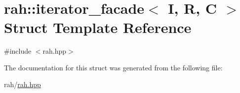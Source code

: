 \hypertarget{structrah_1_1iterator__facade}{}\section{rah\+::iterator\+\_\+facade$<$ I, R, C $>$ Struct Template Reference}
\label{structrah_1_1iterator__facade}


{\ttfamily \#include $<$rah.\+hpp$>$}



The documentation for this struct was generated from the following file\+:\begin{DoxyCompactItemize}
\item 
rah/\mbox{\hyperlink{rah_8hpp}{rah.\+hpp}}\end{DoxyCompactItemize}
